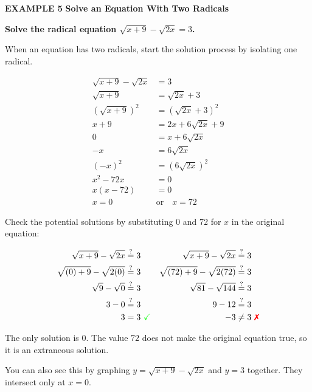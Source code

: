\documentclass{article}
\newenvironment{example}[1]{\textbf{EXAMPLE #1}\quad}{}
\newcommand{\te}[1]{}
\begin{document}
\begin{example}{5}
\textbf{Solve an Equation With Two Radicals}

\textbf{Solve the radical equation $\sqrt{x + 9} - \sqrt{2x} = 3$.}

When an equation has two radicals, start the solution process by isolating one radical.

\begin{align*}
\sqrt{x + 9} - \sqrt{2x} &= 3 \\
\sqrt{x + 9} &= \sqrt{2x} + 3 \quad \text{\te{Isolate one radical sign.}} \\
(\sqrt{x + 9})^2 &= (\sqrt{2x} + 3)^2 \\
x + 9 &= 2x + 6\sqrt{2x} + 9 \\
0 &= x + 6\sqrt{2x} \\
-x &= 6\sqrt{2x} \quad \text{\te{Isolate the remaining radical and square again.}} \\
(-x)^2 &= (6\sqrt{2x})^2 \\
x^2 - 72x &= 0 \\
x(x - 72) &= 0 \\
x = 0 \quad &\text{or} \quad x = 72
\end{align*}

Check the potential solutions by substituting 0 and 72 for $x$ in the original equation:

\begin{align*}
\sqrt{x + 9} - \sqrt{2x} &\stackrel{?}{=} 3 & \sqrt{x + 9} - \sqrt{2x} &\stackrel{?}{=} 3 \\
\sqrt{(0) + 9} - \sqrt{2(0)} &\stackrel{?}{=} 3 & \sqrt{(72) + 9} - \sqrt{2(72)} &\stackrel{?}{=} 3 \\
\sqrt{9} - \sqrt{0} &\stackrel{?}{=} 3 & \sqrt{81} - \sqrt{144} &\stackrel{?}{=} 3 \\
3 - 0 &\stackrel{?}{=} 3 & 9 - 12 &\stackrel{?}{=} 3 \\
3 &= 3 \ \text{\textcolor{green}{\checkmark}} & -3 &\neq 3 \ \text{\textcolor{red}{\ding{55}}}
\end{align*}

The only solution is $0$. The value $72$ does not make the original equation true, so it is an extraneous solution.

You can also see this by graphing $y = \sqrt{x + 9} - \sqrt{2x}$ and $y = 3$ together. They intersect only at $x = 0$.


\end{example}
\end{document}
